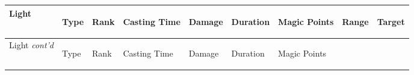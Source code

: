 \documentclass[twoside]{book}
\begin{document}
\begin{longtable}{p{1.25in}lp{2em}p{3em}llp{7em}ll} 
  Light
  &
  \begin{turn}{70}{Type}\end{turn}
          
  &
  \begin{turn}{70}{Rank}\end{turn}
          
  &
  \begin{turn}{70}{Casting Time}\end{turn}
          
  &
  \begin{turn}{70}{Damage}\end{turn}
          
  &
  \begin{turn}{70}{Duration}\end{turn}
          
  &
  \begin{turn}{70}{Magic Points}\end{turn}
          
  &
  \begin{turn}{70}{Range}\end{turn}
          
  &
  \begin{turn}{70}{Target}\end{turn}
          
  \\
  \hline
  \hline
  \endfirsthead
  Light \textit{cont'd}
        
  &
  \begin{turn}{70}{Type}\end{turn}
          
  &
  \begin{turn}{70}{Rank}\end{turn}
          
  &
  \begin{turn}{70}{Casting Time}\end{turn}
          
  &
  \begin{turn}{70}{Damage}\end{turn}
          
  &
  \begin{turn}{70}{Duration}\end{turn}
          
  &
  \begin{turn}{70}{Magic Points}\end{turn}
          

\end{longtable}
\end{document}
